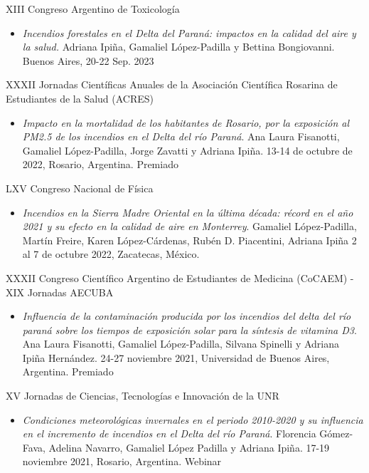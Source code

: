 \documentclass[12pt,letterpaper]{article}
\begin{document}
XIII Congreso Argentino de Toxicología

\begin{itemize}[label={}]
    \item \textit{Incendios forestales en el Delta del Paraná: impactos en la calidad del aire y la salud.} Adriana Ipiña, Gamaliel López-Padilla y Bettina Bongiovanni. Buenos Aires, 20-22 Sep. 2023
\end{itemize}

XXXII Jornadas Científicas Anuales de la Asociación Científica Rosarina de Estudiantes de la Salud (ACRES)
\begin{itemize}[label={}]
    \item \textit{Impacto en la mortalidad de los habitantes de Rosario, por la exposición al PM2.5 de los incendios en el Delta del río Paraná}. Ana Laura Fisanotti, Gamaliel López-Padilla, Jorge Zavatti y Adriana Ipiña. 13-14 de octubre de 2022, Rosario, Argentina. Premiado
\end{itemize}

LXV Congreso Nacional de Física
\begin{itemize}[label={}]
    \item \textit{Incendios en la Sierra Madre Oriental en la última década: récord en el año 2021 y su efecto en la calidad de aire en Monterrey}. Gamaliel López-Padilla, Martín Freire, Karen López-Cárdenas, Rubén D. Piacentini, Adriana Ipiña 2 al 7 de octubre 2022, Zacatecas, México.
\end{itemize}

XXXII Congreso Científico Argentino de Estudiantes de Medicina (CoCAEM) -XIX Jornadas AECUBA
\begin{itemize}[label={}]
    \item \textit{Influencia de la contaminación producida por los incendios del delta del río paraná sobre los tiempos de exposición solar para la síntesis de vitamina D3}. Ana Laura Fisanotti, Gamaliel López-Padilla, Silvana Spinelli y Adriana Ipiña Hernández. 24-27 noviembre 2021, Universidad de Buenos Aires, Argentina. Premiado
\end{itemize}

XV Jornadas de Ciencias, Tecnologías e Innovación de la UNR
\begin{itemize}[label={}]
    \item \textit{Condiciones meteorológicas invernales en el periodo 2010-2020 y su influencia en el incremento de incendios en el Delta del río Paraná}. Florencia Gómez-Fava, Adelina Navarro, Gamaliel López Padilla y Adriana Ipiña. 17-19 noviembre 2021, Rosario, Argentina. Webinar
\end{itemize}
\end{document}
